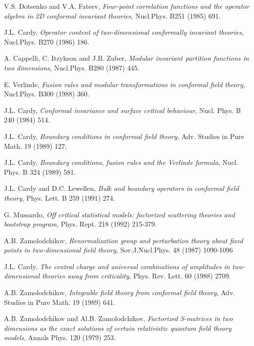 \documentclass[a4paper,12pt]{report}
\begin{document}
\begin{thebibliography}{23}
 V.S. Dotsenko and V.A. Fateev, \textit{Four-point correlation functions and the operator algebra in 2D conformal
invariant theories}, Nucl.Phys. B251 (1985) 691.

 J.L. Cardy, \textit{Operator content of two-dimensional conformally invariant theories}, Nucl.Phys. B270 (1986) 186.

 A. Cappelli, C. Itzykson and J.B. Zuber, \textit{Modular invariant partition
functions in two dimensions}, Nucl.Phys. B280 (1987) 445.

 E. Verlinde, \textit{Fusion rules and modular transformations in conformal field theory},
Nucl.Phys. B300 (1988) 360.




 J.L. Cardy, {\it Conformal invariance and surface critical behaviour}, Nucl. Phys. B 240 (1984) 514.


 J.L. Cardy, {\it Boundary conditions in conformal field theory}, Adv. Studies in Pure Math. 19 (1989)
127;

J.L. Cardy, {\it Boundary conditions, fusion rules and the Verlinde formula}, Nucl. Phys. B 324 (1989) 581.


 J.L. Cardy and D.C. Lewellen, {\it Bulk and boundary operators in conformal field theory},
Phys. Lett. B 259 (1991) 274.




 G. Mussardo, {\it Off critical statistical models: factorized scattering theories and bootstrap program},
Phys. Rept. 218 (1992) 215-379.

 A.B. Zamolodchikov, {\it Renormalization group and perturbation theory about fixed points in
two-dimensional field theory}, Sov.J.Nucl.Phys. 48 (1987) 1090-1096

 J.L. Cardy, \textit{The central charge and universal combinations of amplitudes in two-dimensional
 theories away from criticality}, Phys. Rev. Lett. 60 (1988) 2709.

 A.B. Zamolodchikov, {\it Integrable field theory from conformal field theory},
Adv. Studies in Pure Math. 19 (1989) 641.

 A.B. Zamolodchikov and Al.B. Zamolodchikov, {\it Factorized S-matrices in two dimensions as the exact
solutions of certain relativistic quantum field theory models}, Annals Phys. 120 (1979) 253.



\end{thebibliography}
\end{document}
